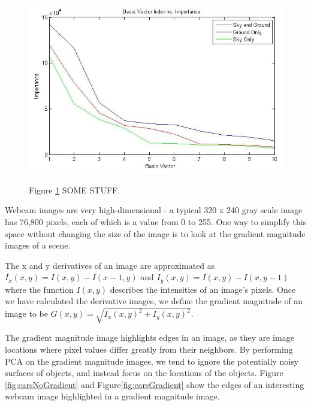 \begin{figure}[ht]
	\centering
		\includegraphics[width=1\textwidth]{figures/skyMaskFig.jpg}
	\label{fig:skyMaskFig}
	
		\caption[Sky Mask stuff.]{Figure \ref{fig:skyMaskFig} SOME STUFF.}
\end{figure}


Webcam images are very high-dimensional - a typical 320 x 240 gray scale image has 76,800 pixels, each of
which is a value from 0 to 255.  One way to simplify this space without changing the size of the image is to look at the gradient magnitude images of a scene.  

The x and y derivatives of an image are approximated as $I_x(x,y) = I(x,y)-I(x-1,y)$ and $I_y(x,y) = I(x,y)-I(x,y-1)$ where the function $I(x,y)$ describes the intensities of an image's pixels.  Once we have calculated the derivative images, we define the gradient magnitude of an image to be $G(x,y) = \sqrt{I_x(x,y)^2 + I_y(x,y)^2}$.

The gradient magnitude image highlights edges in an image, as they are image locations where pixel values differ greatly from their neighbors.  By performing PCA on the gradient magnitude images, we tend to ignore the potentially noisy surfaces of objects, and instead focus on the locations of the objects.  Figure \ref{fig:carsNoGradient} and Figure\ref{fig:carsGradient} show the edges of an interesting webcam image highlighted in a gradient magnitude image.


